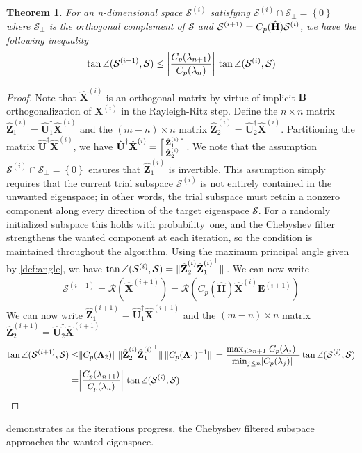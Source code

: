 \documentclass[preprint,3p,number,sort&compress]{elsarticle}
\newtheorem{theorem}{Theorem}[section]
\newcommand{\bB}{\textbf{B}}
\newcommand{\bE}{\textbf{E}}
\newcommand{\bH}{\textbf{H}}
\newcommand{\bX}{\textbf{X}}
\newcommand{\bZ}{\textbf{Z}}
\newcommand{\bU}{\textbf{U}}
\newcommand{\bLam}{\boldsymbol{\Lambda}}
\newcommand{\cblue }{\color{black}}
\newcommand{\cn}{\color{black}}
\DeclarePairedDelimiter\norm{\lVert}{\rVert\,}%
\DeclarePairedDelimiter\abs{\lvert}{\rvert\,}%
\begin{document}
\begin{theorem}
 \label{thm:accurateConv}
 For an n-dimensional space $\mathcal{S}^{(i)}$ satisfying $\mathcal{S}^{(i)}\cap\mathcal{S}_\perp=\left\{0\right\}$ where $\mathcal{S}_\perp$ is the orthogonal complement of $\mathcal{S}$ and $\normalfont\mathcal{S}^{(i+1)}=C_p(\hat{\bH})\mathcal{S}^{(i)}$, we have the following inequality
 \begin{equation*}
 \normalfont\tan{\angle(\mathcal{S}^{(i+1)},\mathcal{S})}\leq\abs*{\frac{C_p(\lambda_{n+1})}{C_p(\lambda_n)}}\tan{\angle(\mathcal{S}^{(i)},\mathcal{S})}
 \end{equation*}
\end{theorem}
\begin{proof}
Note that $\hat{\bX}^{(i)}$ is an orthogonal matrix by virtue of implicit $\bB$ orthogonalization of $\bX^{(i)}$ in the Rayleigh-Ritz step. Define the $n\times n$ matrix $\hat{\bZ}_1^{(i)}=\hat{\bU}_1^\dagger\hat{\bX}^{(i)}$ and the $(m-n)\times n$ matrix $\hat{\bZ}_2^{(i)}=\hat{\bU}_2^\dagger\hat{\bX}^{(i)}$. Partitioning the matrix $\hat{\bU}^\dagger\hat{\bX}^{(i)}$, we have $\hat{\bU}^\dagger\hat{\bX}^{(i)}=\Bigl[\begin{smallmatrix}
  \hat{\bZ}_1^{(i)}\\\hat{\bZ}_2^{(i)}
 \end{smallmatrix}\Bigr]$. We note that the assumption $\mathcal{S}^{(i)}\cap\mathcal{S}_\perp=\left\{0\right\}$ ensures that $\hat{\bZ}_1^{(i)}$ is invertible. {\cblue This assumption simply requires that the current trial subspace $\mathcal{S}^{(i)}$ is not entirely contained in the unwanted eigenspace; in other words, the trial subspace must retain a nonzero component along every direction of the target eigenspace $\mathcal{S}$. For a randomly initialized subspace this holds with probability~one, and the Chebyshev filter strengthens the wanted component at each iteration, so the condition is maintained throughout the algorithm.\cn}
Using the maximum principal angle given by \cref{def:angle}, we have $\tan{\angle(\mathcal{S}^{(i)},\mathcal{S})}=\norm{\hat{\bZ}_2^{(i)}{{}\hat{\bZ}_1^{(i)}}^{+}}$. We can now write
\begin{align*}
 \mathcal{S}^{(i+1)}=\mathcal{R}(\hat{\bX}^{(i+1)})=\mathcal{R}(C_p(\hat{\bH})\hat{\bX}^{(i)}\bE^{(i+1)})
\end{align*}
We can now write $\hat{\bZ}_1^{(i+1)}=\hat{\bU}_1^\dagger\hat{\bX}^{(i+1)}$ and the $(m-n)\times n$ matrix $\hat{\bZ}_2^{(i+1)}=\hat{\bU}_2^\dagger\hat{\bX}^{(i+1)}$
\begin{align*}
 \tan{\angle(\mathcal{S}^{(i+1)},\mathcal{S})}\leq&\norm{C_p(\bLam_2)}\norm{\hat{\bZ}_2^{(i)}{{}\hat{\bZ}_1^{(i)}}^{+}}\norm{C_p(\bLam_1)^{-1}}=\frac{\max_{j\geq n+1}\abs{ C_p(\lambda_{j})}}{\min_{j\leq n}\abs{C_p(\lambda_j)}}\tan{\angle(\mathcal{S}^{(i)},\mathcal{S})}\\=&\abs*{\frac{C_p(\lambda_{n+1})}{C_p(\lambda_n)}}\tan{\angle(\mathcal{S}^{(i)},\mathcal{S})}
\end{align*}
\end{proof} 
 demonstrates as the iterations progress, the Chebyshev filtered subspace approaches the wanted eigenspace.
\end{document}
